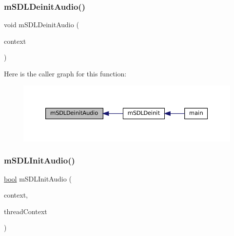\mbox{\label{sdl-audio_8c_adadf9e93127f15bd0b8f6910f1b64628}} 
\subsubsection{\texorpdfstring{m\+S\+D\+L\+Deinit\+Audio()}{mSDLDeinitAudio()}}
{\footnotesize\ttfamily void m\+S\+D\+L\+Deinit\+Audio (\begin{DoxyParamCaption}\item[{struct \mbox{\hyperlink{sdl-audio_8h_structm_s_d_l_audio}{m\+S\+D\+L\+Audio}} $\ast$}]{context }\end{DoxyParamCaption})}

Here is the caller graph for this function\+:
\nopagebreak
\begin{figure}[H]
\begin{center}
\leavevmode
\includegraphics[width=350pt]{sdl-audio_8c_adadf9e93127f15bd0b8f6910f1b64628_icgraph}
\end{center}
\end{figure}
\mbox{\label{sdl-audio_8c_aa58bb1fe9aa1e3a8eaac9b81fdb4c5b6}} 
\subsubsection{\texorpdfstring{m\+S\+D\+L\+Init\+Audio()}{mSDLInitAudio()}}
{\footnotesize\ttfamily \mbox{\hyperlink{libretro_8h_a4a26dcae73fb7e1528214a068aca317e}{bool}} m\+S\+D\+L\+Init\+Audio (\begin{DoxyParamCaption}\item[{struct \mbox{\hyperlink{sdl-audio_8h_structm_s_d_l_audio}{m\+S\+D\+L\+Audio}} $\ast$}]{context,  }\item[{struct m\+Core\+Thread $\ast$}]{thread\+Context }\end{DoxyParamCaption})}


